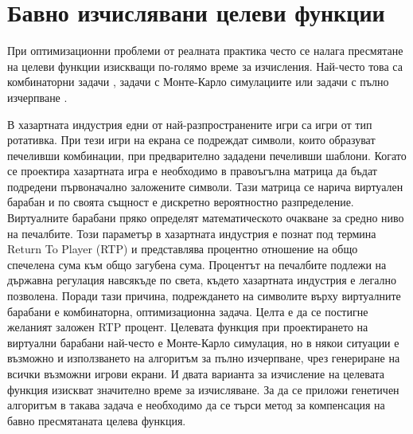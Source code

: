 \section{Бавно изчислявани целеви функции}

При оптимизационни проблеми от реалната практика често се налага пресмятане на целеви функции изискващи по-голямо време за изчисления. Най-често това са комбинаторни задачи \cite{Koleva-01}, задачи с Монте-Карло симулациите или задачи с пълно изчерпване \cite{Keremedchiev-01}.

В хазартната индустрия едни от най-разпространените игри са игри от тип ротативка. При тези игри на екрана се подреждат символи, които образуват печеливши комбинации, при предварително зададени печеливши шаблони. Когато се проектира хазартната игра е необходимо в правоъгълна матрица да бъдат подредени първоначално заложените символи. Тази матрица се нарича виртуален барабан и по своята същност е дискретно вероятностно разпределение. Виртуалните барабани пряко определят математическото очакване за средно ниво на печалбите. Този параметър в хазартната индустрия е познат под термина Return To Player (RTP) и представлява процентно отношение на общо спечелена сума към общо загубена сума. Процентът на печалбите подлежи на държавна регулация навсякъде по света, където хазартната индустрия е легално позволена. Поради тази причина, подреждането на символите върху виртуалните барабани е комбинаторна, оптимизационна задача. Целта е да се постигне желаният заложен RTP процент. Целевата функция при проектирането на виртуални барабани най-често е Монте-Карло симулация, но в някои ситуации е възможно и използването на алгоритъм за пълно изчерпване, чрез генериране на всички възможни игрови екрани. И двата варианта за изчисление на целевата функция изискват значително време за изчисляване. За да се приложи генетичен алгоритъм в такава задача е необходимо да се търси метод за компенсация на бавно пресмятаната целева функция. 

